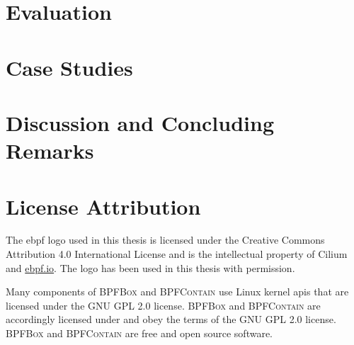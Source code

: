 \documentclass[
  fontsize=12pt,
  titlepage=firstiscover,
  paper=letter,
  oneside,
  cleardoublepage=plain,
  parskip=half-,
  DIV=10,
  parindent,
  appendixprefix,
  chapterprefix,
  listof=totoc,
]{scrbook}
\newcommand{\bpfbox}{\textsc{BPFBox}}
\newcommand{\bpfcontain}{\textsc{BPFContain}}
\begin{document}
\chapter{Evaluation}%
\label{c:evaluation}


\chapter{Case Studies}%
\label{c:case-studies}


\chapter{Discussion and Concluding Remarks}%
\label{c:discussion}


% 

\cleardoublepage%
\printbibliography[heading=bibintoc]%

\appendix%
\printglossary[type=\acronymtype, title=List of Acronyms, toctitle=List of Acronyms]

\chapter{License Attribution}

The \gls{ebpf} logo used in this thesis is licensed under the Creative Commons Attribution
4.0 International License and is the intellectual property of Cilium and \url{ebpf.io}.
The logo has been used in this thesis with permission.

Many components of \bpfbox{} and \bpfcontain{} use Linux kernel \glspl{api} that are
licensed under the GNU GPL 2.0 license. \bpfbox{} and \bpfcontain{} are accordingly
licensed under and obey the terms of the GNU GPL 2.0 license. \bpfbox{} and \bpfcontain{}
are free and open source software.
\end{document}
